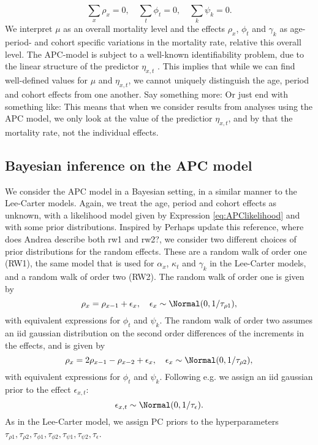 \begin{equation}
    \sum_{x}\rho_x = 0, \quad \sum_{t}\phi_t = 0, \quad \sum_{k} \psi_k = 0. 
    \label{eq:APCconstraints}
\end{equation}
We interpret $\mu$ as an overall mortality level \parencite{RieblerThesis2010} and the effects $\rho_x$, $\phi_t$ and $\gamma_k$ as age- period- and cohort specific variations in the mortality rate, relative this overall level. 
\newpar The APC-model is subject to a well-known identifiability problem, due to the linear structure of the predictor $\eta_{x,t}$ \parencite{RieblerThesis2010}. This implies that while we can find well-defined values for $\mu$ and $\eta_{x,t}$, we cannot uniquely distinguish the age, period and cohort effects from one another. 
\textcolor{myDarkGreen}{Say something more: Or just end with something like: This means that when we consider results from analyses using the APC model, we only look at the value of the predictior $\eta_{x,t}$, and by that the mortality rate, not the individual effects. 
}

\subsection{Bayesian inference on the APC model}
We consider the APC model in a Bayesian setting, in a similar manner to the Lee-Carter models. Again, we treat the age, period and cohort effects as unknown, with a likelihood model given by Expression \ref{eq:APClikelihood} and with some prior distributions. Inspired by \parencite{RieblerThesis2010} \textcolor{myDarkGreen}{Perhaps update this reference, where does Andrea describe both rw1 and rw2?}, we consider two different choices of prior distributions for the random effects. These are a random walk of order one (RW1), the same model that is used for $\alpha_x$, $\kappa_t$ and $\gamma_k$ in the Lee-Carter models, and a random walk of order two (RW2). The random walk of order one is given by
\begin{equation}
    \rho_x = \rho_{x-1} + \epsilon_x, \quad \epsilon_x \sim \Normal(0,1/\tau_{\rho1}),
\end{equation}
with equivalent expressions for $\phi_t$ and $\psi_k$. The random walk of order two assumes an iid gaussian distribution on the second order differences of the increments in the effects, and is given by
\begin{equation}
    \rho_x = 2\rho_{x-1} - \rho_{x-2} + \epsilon_x, \quad \epsilon_x \sim \Normal(0, 1/\tau_{\rho2}),
    \label{eq:APCrw2}
\end{equation}
with equivalent expressions for $\phi_t$ and $\psi_k$. 
Following e.g. \textcite{Besag1995} we assign an iid gaussian prior to the effect $\epsilon_{x,t}$:
\begin{equation}
    \epsilon_{x,t} \sim \Normal(0,1/\tau_\epsilon).
\end{equation}
As in the Lee-Carter model, we assign PC priors to the hyperparameters $\tau_{\rho 1}, \tau_{\rho 2}, \tau_{\phi 1}, \tau_{\phi 2}, \tau_{\psi 1}, \tau_{\psi 2}, \tau_\epsilon$. 

